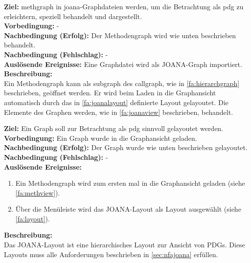 \label{fa:methview}
\textbf{Ziel:} \gls{methgraph} in \gls{joana}-Graphdateien werden, um die Betrachtung als \gls{pdg} zu erleichtern, speziell behandelt und dargestellt.\\
\textbf{Vorbedingung:} -\\
\textbf{Nachbedingung (Erfolg):} Der Methodengraph wird wie unten beschrieben behandelt. \\
\textbf{Nachbedingung (Fehlschlag):} -\\
\textbf{Auslösende Ereignisse:} Eine Graphdatei wird als JOANA-Graph importiert.\\
\textbf{Beschreibung:}\\
Ein Methodengraph kann als \gls{subgraph} des \gls{callgraph}, wie in \ref{fa:hierarchgraph} beschrieben, geöffnet werden.
Er wird beim Laden in die Graphansicht automatisch durch das in \ref{fa:joanalayout} definierte Layout gelayoutet.
Die Elemente des Graphen werden, wie in \ref{fa:joanaview} beschrieben, behandelt.


\label{fa:joanalayout}
\textbf{Ziel:} Ein Graph soll zur Betrachtung als \gls{pdg} sinnvoll gelayoutet werden.\\ %
\textbf{Vorbedingung:} Ein Graph wurde in die Graphansicht geladen.\\
\textbf{Nachbedingung (Erfolg):} Der Graph wurde wie unten beschrieben gelayoutet.\\
\textbf{Nachbedingung (Fehlschlag):} -\\
\textbf{Auslösende Ereignisse:}
\begin{enumerate}[nolistsep, label=(\alph*)]
  \item Ein Methodengraph wird zum ersten mal in die Graphansicht geladen (siehe \ref{fa:methview}).
  \item Über die Menüleiste wird das JOANA-Layout als Layout ausgewählt (siehe \ref{fa:layout}).
\end{enumerate}
\textbf{Beschreibung:}\\
Das JOANA-Layout ist eine hierarchisches Layout zur Ansicht von PDGs.
Diese Layouts muss alle Anforderungen beschrieben in \ref{sec:nfajoana} erfüllen.

